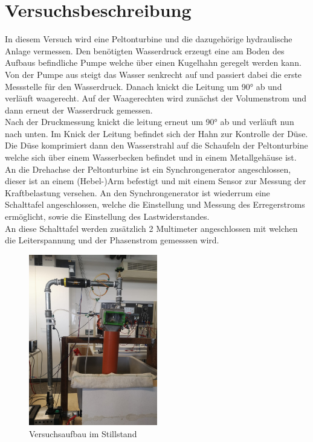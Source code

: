 \section{Versuchsbeschreibung}
\label{section:Versuchsbeschreibung}
%
In diesem Versuch wird eine Peltonturbine und die dazugehörige hydraulische Anlage vermessen.
Den benötigten Wasserdruck erzeugt eine am Boden des Aufbaus befindliche Pumpe welche über einen Kugelhahn geregelt werden kann.
Von der Pumpe aus steigt das Wasser senkrecht auf und passiert dabei die erste Messstelle für den Wasserdruck.
Danach knickt die Leitung um 90° ab und verläuft waagerecht. Auf der Waagerechten wird zunächst der Volumenstrom und dann erneut der Wasserdruck gemessen.\\
Nach der Druckmessung knickt die leitung erneut um 90° ab und verläuft nun nach unten. Im Knick der Leitung befindet sich der Hahn zur Kontrolle der Düse.
Die Düse komprimiert dann den Wasserstrahl auf die Schaufeln der Peltonturbine welche sich über einem Wasserbecken befindet und in einem Metallgehäuse ist.\\
An die Drehachse der Peltonturbine ist ein Synchrongenerator angeschlossen, dieser ist an einem (Hebel-)Arm befestigt und mit einem Sensor zur Messung der Kraftbelastung versehen.
An den Synchrongenerator ist wiederrum eine Schalttafel angeschlossen, welche die Einstellung und Messung des Erregerstroms ermöglicht, sowie die Einstellung des Lastwiderstandes.\\
An diese Schalttafel werden zusätzlich 2 Multimeter angeschlossen mit welchen die Leiterspannung und der Phasenstrom gemesssen wird.
%
\begin{figure}[!ht]
    \centering
    \includegraphics[width=0.5\textwidth]{Abbildungen/Aufbau Pelton.jpeg}
    \caption{Versuchsaufbau im Stillstand}
    \label{fig:Aufbau_Stillstand}
\end{figure}

